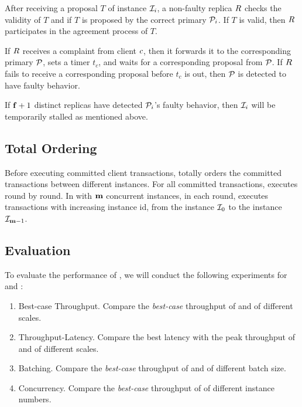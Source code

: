 \par After receiving a proposal $T$ of instance $\mathcal{I}_{i}$, a non-faulty replica $\Replica{}$ 
checks the validity of $T$ and if $T$ is proposed by the correct primary $\mathcal{P}_{i}$. If $T$ is valid, 
then $\Replica{}$ participates in the \PBFT{} agreement process of $T$.

\par If $\Replica{}$ receives a complaint from client $\Client{}$, then it forwards it to the corresponding 
primary $\mathcal{P}_{}$, sets a timer $t_c$, and waits for a corresponding proposal from $\mathcal{P}_{}$. If $\Replica{}$ 
fails to receive a corresponding proposal before $t_c$ is out, then $\mathcal{P}_{}$ is detected to have faulty behavior. 

\par If $\mathbf{f}+1$ distinct replicas have detected $\mathcal{P}_{i}$'s faulty behavior, then $\mathcal{I}_{i}$ will be temporarily 
stalled as mentioned above.

\subsection{Total Ordering}

\par Before executing committed client transactions, \RCC{} totally orders the committed transactions between different 
instances. For all committed transactions, \RCC{} executes round by round. In \RCC{} with $\mathbf{m}$ concurrent instances, in 
each round, \RCC{} executes transactions with increasing instance id, from the instance $\mathcal{I}_{0}$ to the instance $\mathcal{I}_{\mathbf{m}-1}$.

\subsection{Evaluation}

\par To evaluate the performance of \RCC{}, we will conduct the following experiments for \RCC{} and \PBFT{}:

\begin{enumerate}
    \item Best-case Throughput. Compare the \emph{best-case} throughput of \RCC{} and \PBFT{} of different scales.
    \item Throughput-Latency. Compare the best latency with the peak throughput of \RCC{} and \PBFT{} of different scales.
    \item Batching. Compare the \emph{best-case} throughput of \RCC{} and \PBFT{} of different batch size.
    \item Concurrency. Compare the \emph{best-case} throughput of \RCC{} of different instance numbers.
\end{enumerate}